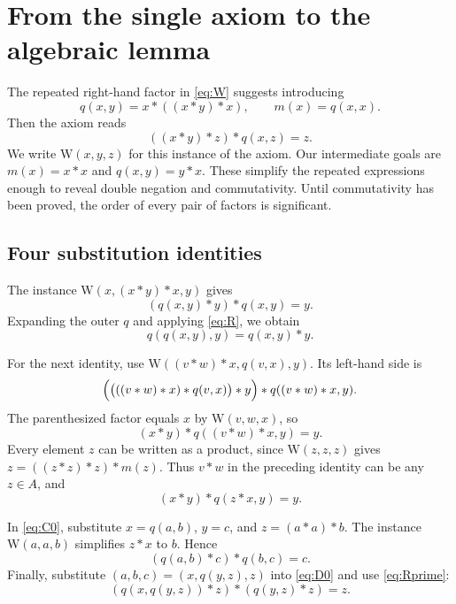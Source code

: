 \documentclass[11pt,a4paper]{article}
\newcommand{\W}{\mathrm{W}}
\begin{document}
\section{From the single axiom to the algebraic lemma}\label{sec:equations}
The repeated right-hand factor in \eqref{eq:W} suggests introducing
\[
 q(x,y)=x*((x*y)*x),\qquad m(x)=q(x,x).
\]
Then the axiom reads
\[
 ((x*y)*z)*q(x,z)=z.
\]
We write $\W(x,y,z)$ for this instance of the axiom. Our intermediate
goals are $m(x)=x*x$ and $q(x,y)=y*x$. These simplify the repeated
expressions enough to reveal double negation and commutativity.
Until commutativity has been proved, the order of every pair of factors
is significant.

\subsection{Four substitution identities}
The instance $\W(x,(x*y)*x,y)$ gives
\begin{equation}
 (q(x,y)*y)*q(x,y)=y.\tag{R}\label{eq:R}
\end{equation}
Expanding the outer $q$ and applying \eqref{eq:R}, we obtain
\begin{equation}
 q(q(x,y),y)=q(x,y)*y.\tag{R'}\label{eq:Rprime}
\end{equation}

For the next identity, use
$\W((v*w)*x,q(v,x),y)$. Its left-hand side is
\[
 \Bigl(\bigl(((v*w)*x)*q(v,x)\bigr)*y\Bigr)*q((v*w)*x,y).
\]
The parenthesized factor equals $x$ by $\W(v,w,x)$, so
\[
 (x*y)*q((v*w)*x,y)=y.
\]
Every element $z$ can be written as a product, since $\W(z,z,z)$ gives
$z=((z*z)*z)*m(z)$. Thus $v*w$ in the preceding identity can be any
$z\in A$, and
\begin{equation}
 (x*y)*q(z*x,y)=y.\tag{$C_0$}\label{eq:C0}
\end{equation}

In \eqref{eq:C0}, substitute $x=q(a,b)$, $y=c$, and $z=(a*a)*b$.
The instance $\W(a,a,b)$ simplifies $z*x$ to $b$. Hence
\begin{equation}
 (q(a,b)*c)*q(b,c)=c.\tag{$D_0$}\label{eq:D0}
\end{equation}
Finally, substitute $(a,b,c)=(x,q(y,z),z)$ into \eqref{eq:D0} and
use \eqref{eq:Rprime}:
\begin{equation}
 (q(x,q(y,z))*z)*(q(y,z)*z)=z.\tag{$J_0$}\label{eq:J0}
\end{equation}
\end{document}
